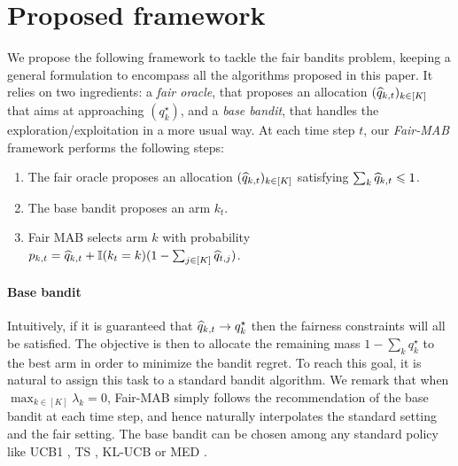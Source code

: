 \section{Proposed framework}

We propose the following framework to tackle the fair bandits problem, keeping a general formulation to encompass all the algorithms proposed in this paper. It relies on two ingredients: a \emph{fair oracle}, that proposes an allocation $(\widehat{q}_{k,t})_{k\in [K]}$ that aims at approaching $(q_k^\star)$, and a \emph{base bandit}, that handles the exploration/exploitation in a more usual way. At each time step $t$, our \emph{Fair-MAB} framework performs the following steps:

\begin{enumerate}
\item The fair oracle proposes an allocation $(\widehat{q}_{k,t})_{k\in [K]}$ satisfying $\sum_k \widehat{q}_{k, t}\leqslant1$.
\item The base bandit proposes an arm $k_t$.
\item Fair MAB selects arm $k$ with probability $p_{k, t}= \widehat{q}_{k,t} + \mathbb{I}(k_t=k)(1-\sum_{j \in [K]}\widehat{q}_{t,j})$.
\end{enumerate}

\paragraph{Base bandit} Intuitively, if it is guaranteed that $\widehat{q}_{k, t} \rightarrow q_k^\star$ then the fairness constraints will all be satisfied. The objective is then to allocate the remaining mass $1-\sum_k q_k^\star$ to the best arm in order to minimize the bandit regret. To reach this goal, it is natural to assign this task to a standard bandit algorithm. We remark that when $\max_{k \in [K]} \lambda_k= 0$, Fair-MAB simply follows the recommendation of the base bandit at each time step, and hence naturally interpolates the standard setting and the fair setting. The base bandit can be chosen among any standard policy like UCB1 \citep{auer2002finite}, TS \citep{TS_1933, TS12AG}, KL-UCB \citep{KL_UCB} or MED \citep{honda11MED, baudry2023general}. %

